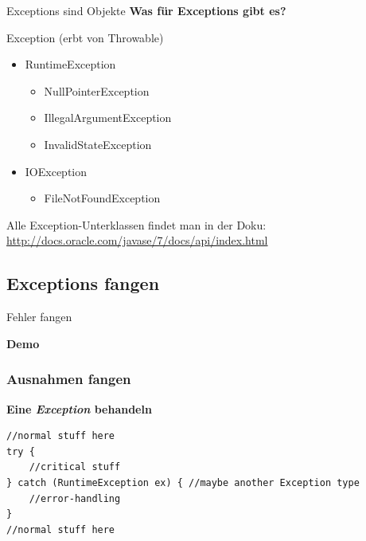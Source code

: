 \documentclass[18pt]{beamer}
\begin{document}
\begin{frame}{Exceptions sind Objekte}
	\textbf{Was für Exceptions gibt es?}
	
	Exception (erbt von Throwable)
	\begin{itemize}
			\item RuntimeException
			\begin{itemize}
				\item NullPointerException
				\item IllegalArgumentException
				\item InvalidStateException
			\end{itemize}
			\item IOException
			\begin{itemize}
				\item FileNotFoundException
			\end{itemize}
	\end{itemize}\pause
	
	Alle Exception-Unterklassen findet man in der Doku:\\
	\url{http://docs.oracle.com/javase/7/docs/api/index.html}
\end{frame}

\subsection*{Exceptions fangen}
\begin{frame}{Fehler fangen}
	\begin{center}
		\textbf{Demo}
	\end{center}
\end{frame}


\begin{frame}[containsverbatim]
	\frametitle{Ausnahmen fangen}
	
	\textbf{Eine \emph{Exception} behandeln}
	\begin{lstlisting}
//normal stuff here
try {
	//critical stuff
} catch (RuntimeException ex) { //maybe another Exception type
	//error-handling
}
//normal stuff here
	\end{lstlisting}
\end{frame}

\end{document}
